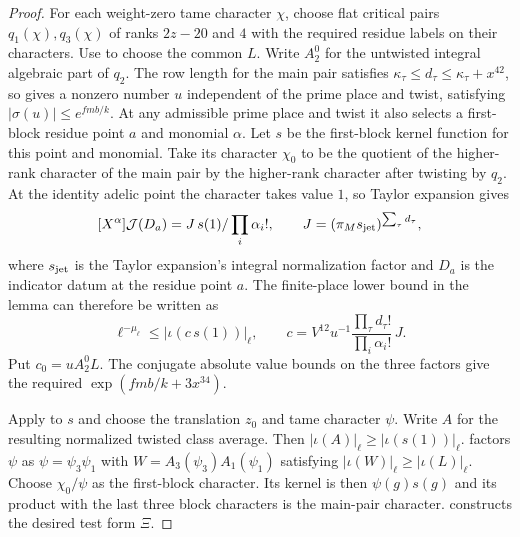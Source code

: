 \begin{proof}
For each weight-zero tame character $\chi$, choose flat critical pairs $q_1(\chi),q_3(\chi)$ of ranks $2z-20$ and $4$ with the required residue labels on their characters. Use  to choose the common $L$. Write $A_2^0$ for the untwisted integral algebraic part of $q_2$. The row length for the main pair satisfies $\kappa_\tau\le d_\tau\le\kappa_\tau+x^{42}$, so  gives a nonzero number $u$ independent of the prime place and twist, satisfying $|\sigma(u)|\le e^{fmb/k}$. At any admissible prime place and twist it also selects a first-block residue point $a$ and monomial $\alpha$. Let $s$ be the first-block kernel function for this point and monomial. Take its character $\chi_0$ to be the quotient of the higher-rank character of the main pair by the higher-rank character after twisting by $q_2$. At the identity adelic point the character takes value $1$, so Taylor expansion gives
\[
 [X^\alpha]\mathcal J(D_a)=J\,s(1)/\prod_i\alpha_i!,
 \qquad J=(\pi_M s_{\rm jet})^{\sum_\tau d_\tau},
\]
where $s_{\rm jet}$ is the Taylor expansion's integral normalization factor and $D_a$ is the indicator datum at the residue point $a$. The finite-place lower bound in the lemma can therefore be written as
\[
 \ell^{-\mu_\ell}\le |\iota(c\,s(1))|_\ell,\qquad
 c=V^{12}u^{-1}
       \frac{\prod_\tau d_\tau!}{\prod_i\alpha_i!}\,J.
\]
Put $c_0=uA_2^0 L$. The conjugate absolute value bounds on the three factors give the required $\exp(fmb/k+3x^{34})$.

Apply  to $s$ and choose the translation $z_0$ and tame character $\psi$. Write $A$ for the resulting normalized twisted class average. Then $|\iota(A)|_\ell\ge|\iota(s(1))|_\ell$.  factors $\psi$ as $\psi=\psi_3\psi_1$ with $W=A_3(\psi_3)A_1(\psi_1)$ satisfying $|\iota(W)|_\ell\ge|\iota(L)|_\ell$. Choose $\chi_0/\psi$ as the first-block character. Its kernel is then $\psi(g)s(g)$ and its product with the last three block characters is the main-pair character.  constructs the desired test form $\Xi$.


\end{proof}
